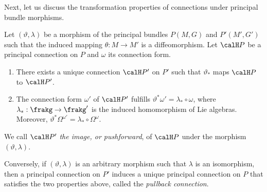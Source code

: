Next, let us discuss the transformation properties of connections under principal bundle morphisms.

\begin{prop}[{{\cite[Props.~1.3.13, 1.3.15]{RS2}}}]\label{prop 1.3.13/15 RS2}
    Let $(\vartheta,\lambda)$ be a morphism of the principal bundles $P(M,G)$ and $P'(M',G')$ such that the induced mapping $\theta:M\to M'$ is a diffeomorphism. Let $\calH P$ be a principal connection on $P$ and $\omega$ its connection form.
    \begin{enumerate}
        \item There exists a unique connection $\calH P'$ on $P'$ such that $\vartheta_\ast$ maps $\calH P$ to $\calH P'$.
        \item The connection form $\omega'$ of $\calH P'$ fulfills $\vartheta^\ast\omega'=\lambda_{\ast}\circ \omega$, where $\lambda_\ast:\frakg\to \frakg'$ is the induced homomorphism of Lie algebras. Moreover, $\vartheta^\ast\Omega^{\omega'}=\lambda_\ast\circ\Omega^\omega$.
    \end{enumerate}
    We call $\calH P'$ \emph{the image, or pushforward}, of $\calH P$ under the morphism $(\vartheta,\lambda)$. 

    Conversely, if $(\vartheta,\lambda)$ is an arbitrary morphism such that $\lambda$ is an isomorphism, then a principal connection on $P'$ induces a unique principal connection on $P$ that satisfies the two properties above, called the \emph{pullback connection}.
\end{prop}
